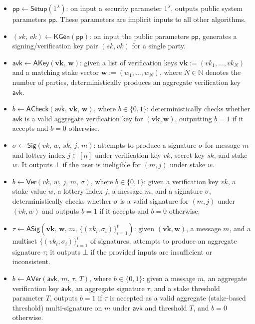 \documentclass{article}
\begin{document}
\begin{itemize}
  \item $\mathsf{pp} \leftarrow \mathsf{Setup}(1^\lambda)$:  
        on input a security parameter $1^\lambda$, outputs public system parameters $\mathsf{pp}$.  
        These parameters are implicit inputs to all other algorithms.

  \item $(sk,\, vk) \leftarrow \mathsf{KGen}(\mathsf{pp})$:  
        on input the public parameters $\mathsf{pp}$, generates a signing/verification key pair $(sk,vk)$ for a single party.

  \item $\mathsf{avk} \leftarrow \mathsf{AKey}(\mathbf{vk},\, \mathbf{w})$:  
        given a list of verification keys $\mathbf{vk} := (vk_1,\ldots,vk_N)$ and a matching stake vector $\mathbf{w} := (w_1,\ldots,w_N)$,  
        where $N \in \mathbb{N}$ denotes the number of parties, deterministically produces an aggregate verification key $\mathsf{avk}$.

  \item $b \leftarrow \mathsf{ACheck}(\mathsf{avk},\, \mathbf{vk},\, \mathbf{w})$, where $b \in \{0,1\}$:  
        deterministically checks whether $\mathsf{avk}$ is a valid aggregate verification key for $(\mathbf{vk},\mathbf{w})$,  
        outputting $b = 1$ if it accepts and $b = 0$ otherwise.

  \item $\sigma \leftarrow \mathsf{Sig}(vk,\, w,\, sk,\, j,\, m)$:  
        attempts to produce a signature $\sigma$ for message $m$ and lottery index $j \in [n]$  
        under verification key $vk$, secret key $sk$, and stake $w$.  
        It outputs $\bot$ if the user is ineligible for $(m,j)$ under stake $w$.

  \item $b \leftarrow \mathsf{Ver}(vk,\, w,\, j,\, m,\, \sigma)$, where $b \in \{0,1\}$:  
        given a verification key $vk$, a stake value $w$, a lottery index $j$, a message $m$, and a signature $\sigma$,  
        deterministically checks whether $\sigma$ is a valid signature for $(m,j)$ under $(vk,w)$  
        and outputs $b = 1$ if it accepts and $b = 0$ otherwise.

  \item $\tau \leftarrow \mathsf{ASig}(\mathbf{vk},\, \mathbf{w},\, m,\, \{(vk_i,\sigma_i)\}_{i=1}^{t})$:  
        given $(\mathbf{vk},\mathbf{w})$, a message $m$, and a multiset $\{(vk_i,\sigma_i)\}_{i=1}^{t}$ of signatures,  
        attempts to produce an aggregate signature $\tau$; it outputs $\bot$ if the provided inputs are insufficient or inconsistent.

  \item $b \leftarrow \mathsf{AVer}(\mathsf{avk},\, m,\, \tau,\, T)$, where $b \in \{0,1\}$:  
        given a message $m$, an aggregate verification key $\mathsf{avk}$, an aggregate signature $\tau$,  
        and a stake threshold parameter $T$, outputs $b = 1$ if $\tau$ is accepted as a valid aggregate  
        (stake-based threshold) multi-signature on $m$ under $\mathsf{avk}$ and threshold $T$, and $b = 0$ otherwise.

\end{itemize}
\end{document}
